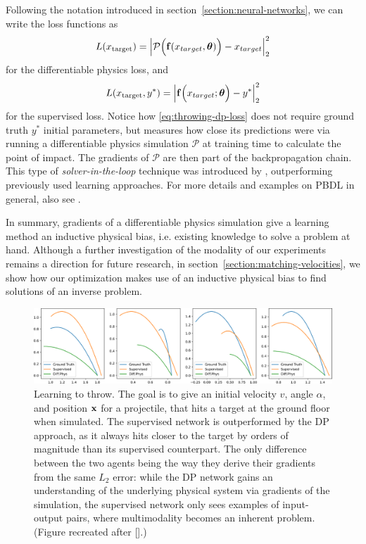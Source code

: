 Following the notation introduced in section~\ref{section:neural-networks}, we
can write the loss functions as
\begin{equation}\label{eq:throwing-dp-loss}
  L(x_{\text{target}}) = 
  \abs{\mathcal{P}\Big(\vb{f}(x_{target},\boldsymbol{\theta})\Big) - x_{target}}_2^2
\end{equation}
for the differentiable physics loss, and 
\begin{equation}\label{eq:throwing-supervised-loss}
  L(x_{\text{target}}, y^*) = 
  \abs{\vb{f}\Big(x_{target};\boldsymbol{\theta}\Big)-y^*}_2^2
\end{equation}
for the supervised loss. Notice how \eqref{eq:throwing-dp-loss} does not require
ground truth $y^*$ initial parameters, but measures how close its predictions
were via running a differentiable physics simulation $\mathcal{P}$ at training
time to calculate the point of impact. The gradients of $\mathcal{P}$ are then
part of the backpropagation chain. This type of \textit{solver-in-the-loop}
technique was introduced by \cite{solver-in-the-loop}, outperforming previously
used learning approaches. For more details and examples on \acf{PBDL} in general,
also see \cite{pbdl}.

In summary, gradients of a differentiable physics simulation give a learning
method an inductive physical bias, i.e. existing knowledge to solve a problem at
hand. Although a further investigation of the modality of our experiments
remains a direction for future research, in
section~\ref{section:matching-velocities}, we show how our optimization makes
use of an inductive physical bias to find solutions of an inverse problem.

\begin{figure}
  \centering
  \includegraphics[width=\textwidth]{figures/throwing_results}
  \caption{Learning to throw. The goal is to give an initial velocity $v$, angle
    $\alpha$, and position $\vb{x}$ for a projectile, that hits a target at the
    ground floor when simulated.  The supervised network is outperformed by the
    \ac{DP} approach, as it always hits closer to the target by orders of
    magnitude than its supervised counterpart.  The only difference between the
    two agents being the way they derive their gradients from the same $L_2$
    error: while the \ac{DP} network gains an understanding of the underlying
    physical system via gradients of the simulation, the supervised network only
    sees examples of input-output pairs, where multimodality becomes an inherent
    problem.  (Figure recreated after [\cite{LearnToThrow}].)
  }
    \label{fig:learning-to-throw}
\end{figure}
